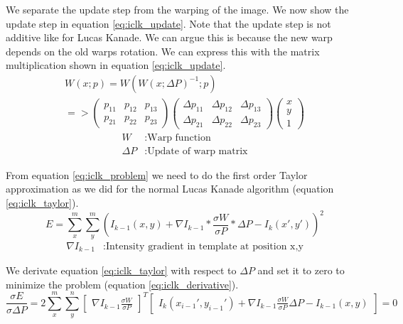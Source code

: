 \documentclass[11pt,a4paper,titlepage,oneside]{report}
\begin{document}
We separate the update step from the warping of the image. We now show the update step in equation \ref{eq:iclk_update}. Note that the update step is not additive like for Lucas Kanade. We can argue this is because the new warp depends on the old warps rotation. We can express this with the matrix multiplication shown in equation \ref{eq:iclk_update}.
\begin{equation}\label{eq:iclk_update}
  \begin{gathered}
    W(x;p)=W(W(x;\Delta P)^{-1}; p)\\
    =>
    \begin{pmatrix}
    p_{11} & p_{12} & p_{13} \\
    p_{21} & p_{22} & p_{23}
    \end{pmatrix}
    \begin{pmatrix}
      \Delta p_{11} & \Delta p_{12} & \Delta p_{13} \\
      \Delta p_{21} & \Delta p_{22} & \Delta p_{23}
    \end{pmatrix}
    \begin{pmatrix}
      x\\
      y\\
      1
    \end{pmatrix}
  \end{gathered}
\end{equation}
\begin{align*}
  W               &: \text{Warp function}\\
  \Delta P        &: \text{Update of warp matrix}
\end{align*}

From equation \ref{eq:iclk_problem} we need to do the first order Taylor approximation as we did for the normal Lucas Kanade algorithm (equation \ref{eq:iclk_taylor}).
\begin{equation}\label{eq:iclk_taylor}
  E=\sum_x^m\sum_y^m(I_{k-1}(x,y)+\nabla I_{k-1}*\frac{\sigma W}{\sigma P}*\Delta P-I_{k}(x',y'))^2
\end{equation}
\begin{align*}
  \nabla I_{k-1}  &:  \text{Intensity gradient in template at position x,y}
\end{align*}

We derivate equation \ref{eq:iclk_taylor} with respect to $\Delta P$ and set it to zero to minimize the problem (equation \ref{eq:iclk_derivative}).
\begin{equation}\label{eq:iclk_derivative}
  \frac{\sigma E}{\sigma \Delta P}=2\sum_x^m\sum_y^n\begin{bmatrix}\nabla I_{k-1}\frac{\sigma W}{\sigma P}\end{bmatrix}^T\begin{bmatrix}I_{k}(x_{i-1}',y_{i-1}')+\nabla I_{k-1}\frac{\sigma W}{\sigma P}\Delta P-I_{k-1}(x,y)\end{bmatrix}=0
\end{equation}
\end{document}

